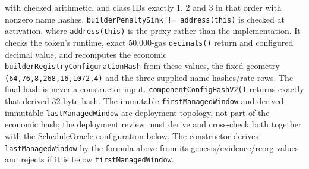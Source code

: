 \documentclass[a4paper,11pt]{article}
\newcommand{\code}[1]{\nolinkurl{#1}}
\begin{document}
with checked arithmetic, and
class IDs exactly 1, 2 and 3 in that order with nonzero name hashes.
\code{builderPenaltySink != address(this)} is checked at activation, where
\code{address(this)} is the proxy rather than the implementation.  It checks
the token's runtime, exact 50,000-gas \code{decimals()} return and configured
decimal value, and recomputes the economic
\code{builderRegistryConfigurationHash} from these values, the fixed geometry
\code{(64,76,8,268,16,1072,4)} and the three supplied name hashes/rate rows.
The final hash is never a constructor input.  \code{componentConfigHashV2()}
returns exactly that derived 32-byte hash.  The immutable
\code{firstManagedWindow} and derived immutable \code{lastManagedWindow}
are deployment topology, not part of the economic hash; the deployment review
must derive and cross-check both together with the ScheduleOracle
configuration below.  The constructor derives \code{lastManagedWindow} by the
formula above from its genesis/evidence/reorg values and rejects if it is below
\code{firstManagedWindow}.
\end{document}
